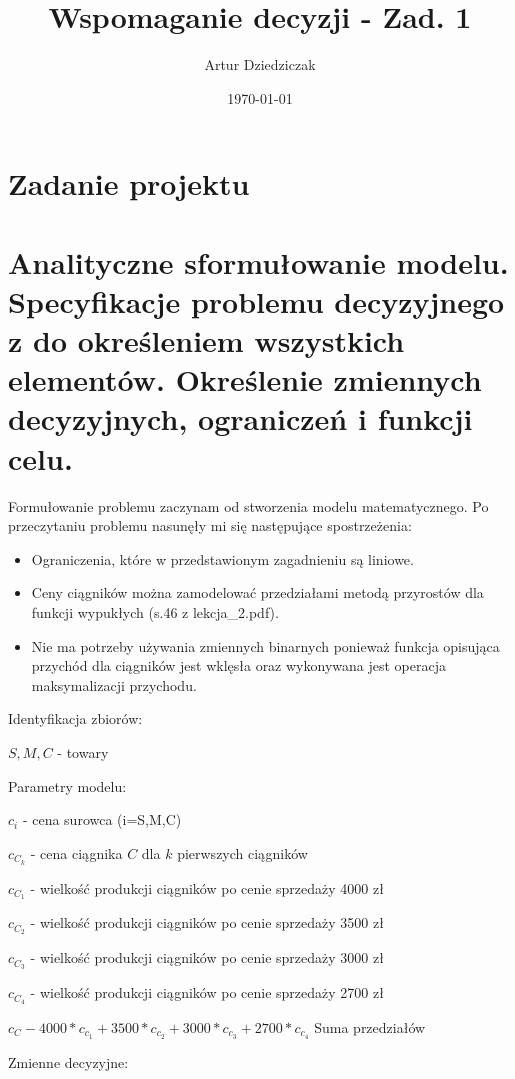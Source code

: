 \documentclass{article}
\title{Wspomaganie decyzji - Zad. 1}
\author{Artur Dziedziczak}
\date{\today}
\begin{document}
\maketitle

\section{Zadanie projektu}

\section{Analityczne sformułowanie modelu. Specyfikacje problemu decyzyjnego z do określeniem wszystkich elementów. Określenie zmiennych decyzyjnych, ograniczeń i funkcji celu.}

Formułowanie problemu zaczynam od stworzenia modelu matematycznego.
Po przeczytaniu problemu nasunęły mi się następujące spostrzeżenia:

\begin{itemize}
	\item Ograniczenia, które w przedstawionym zagadnieniu są liniowe.
	\item Ceny ciągników można zamodelować przedziałami metodą przyrostów dla funkcji wypukłych (s.46 z lekcja\_2.pdf). 
	\item Nie ma potrzeby używania zmiennych binarnych ponieważ funkcja opisująca przychód dla ciągników jest wklęsła oraz wykonywana jest operacja maksymalizacji przychodu.
\end{itemize}


\noindent
Identyfikacja zbiorów: 

${ S, M ,C }$ - towary

\noindent
Parametry modelu:

$c_i$ - cena surowca (i=S,M,C)

$c_C_k$ - cena ciągnika $C$ dla $k$ pierwszych ciągników

$c_C_1$ - wielkość produkcji ciągników po cenie sprzedaży 4000 zł

$c_C_2$ - wielkość produkcji ciągników po cenie sprzedaży 3500 zł

$c_C_3$ - wielkość produkcji ciągników po cenie sprzedaży 3000 zł

$c_C_4$ - wielkość produkcji ciągników po cenie sprzedaży 2700 zł

$c_C - 4000 * c_c_1 + 3500 * c_c_2 + 3000 * c_c_3 + 2700 * c_c_4$ Suma przedziałów

\noindent
Zmienne decyzyjne:
\end{document}
